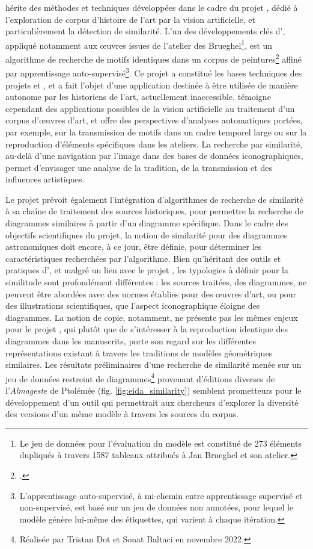 \vhs hérite des méthodes et techniques développées dans le cadre du projet \enherit, dédié à l'exploration de corpus d'histoire de l'art par la vision artificielle, et particulièrement la détection de similarité. L'un des développements clés d'\enherit, appliqué notamment aux œuvres issues de l'atelier des Brueghel\footnote{Le jeu de données pour l'évaluation du modèle est constitué de 273 éléments dupliqués à travers 1587 tableaux attribués à Jan Brueghel et son atelier.}, est un algorithme de recherche de motifs identiques dans un corpus de peintures\footcite{shenDiscoveringVisualPatterns2019} affiné par apprentissage auto-supervisé\footnote{L'apprentissage auto-supervisé, à mi-chemin entre apprentissage supervisé et non-supervisé, est basé sur un jeu de données non annotées, pour lequel le modèle génère lui-même des étiquettes, qui varient à chaque itération.}. Ce projet a constitué les bases techniques des projets \eida et \vhs, et a fait l'objet d'une application destinée à être utilisée de manière autonome par les historiens de l'art, actuellement inaccessible. \enherit témoigne cependant des applications possibles de la vision artificielle au traitement d'un corpus d'œuvres d'art, et offre des perspectives d'analyses automatiques portées, par exemple, sur la transmission de motifs dans un cadre temporel large ou sur la reproduction d'éléments spécifiques dans les ateliers. La recherche par similarité, au-delà d'une navigation par l'image dans des bases de données iconographiques, permet d'envisager une analyse de la tradition, de la transmission et des influences artistiques.

Le projet \eida prévoit également l'intégration d'algorithmes de recherche de similarité à sa chaîne de traitement des sources historiques, pour permettre la recherche de diagrammes similaires à partir d'un diagramme spécifique. Dans le cadre des objectifs scientifiques du projet, la notion de similarité pour des diagrammes astronomiques doit encore, à ce jour, être définie, pour déterminer les caractéristiques recherchées par l'algorithme. Bien qu'héritant des outils et pratiques d'\enherit, et malgré un lien avec le projet \vhs, les typologies à définir pour la similitude sont profondément différentes : les sources traitées, des diagrammes, ne peuvent être abordées avec des normes établies pour des œuvres d'art, ou pour des illustrations scientifiques, que l'aspect iconographique éloigne des diagrammes. La notion de copie, notamment, ne présente pas les mêmes enjeux pour le projet \eida, qui plutôt que de s'intéresser à la reproduction identique des diagrammes dans les manuscrits, porte son regard sur les différentes représentations existant à travers les traditions de modèles géométriques similaires. Les résultats préliminaires d'une recherche de similarité menée sur un jeu de données restreint de diagrammes\footnote{Réalisée par Tristan Dot et Sonat Baltaci en novembre 2022.} provenant d'éditions diverses de l'\textit{Almageste} de Ptolémée (fig. \ref{fig:eida_similarity}) semblent prometteurs pour le développement d'un outil qui permettrait aux chercheurs d'explorer la diversité des versions d'un même modèle à travers les sources du corpus.

